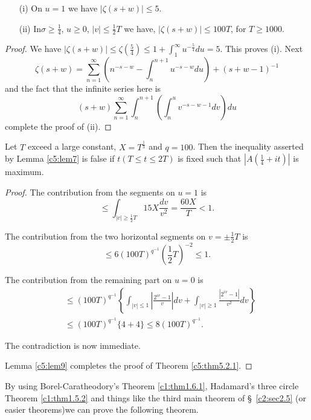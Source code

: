 \begin{lem}\label{c5:lem8}
\begin{itemize}
\item[\rm(i)] On $u=1$ we have $|\zeta(s+w)|\leq 5$. 

\item[\rm(ii)] In\pageoriginale $\sigma\geq \frac{1}{4}$, $u\geq 0$,
  $|v|\leq \frac{1}{2}T$ we have, $|\zeta(s+w)|\leq 100T$, for $T\geq
  1000$. 
\end{itemize}
\end{lem}

\begin{proof}
We have $|\zeta(s+w)|\leq \zeta(\frac{5}{4})\leq
1+\int^{\infty}_{1}u^{-\frac{5}{4}}du=5$. This proves (i). Next
$$
\zeta(s+w)=\sum^{\infty}_{n=1}(n^{-s-w}-\int^{n+1}_{n}u^{-s-w}du)+(s+w-1)^{-1} 
$$
and the fact that the infinite series here is
$$
(s+w)\sum^{\infty}_{n=1}\int^{n+1}_{n}\left(\int^{u}_{n}v^{-s-w-1}dv\right)du 
$$
complete the proof of (ii).
\end{proof}

\begin{lem}\label{c5:lem9}
Let $T$ exceed a large constant, $X=T^{\frac{1}{3}}$ and $q=100$. Then
the inequality asserted by Lemma \ref{c5:lem7} is false if $t(T\leq
t\leq 2T)$ is fixed such that $|A(\frac{1}{4}+it)|$ is maximum.
\end{lem}

\begin{proof}
The contribution from the segments on $u=1$ is
$$
\leq \int_{|v|\geq \frac{1}{2}T}15X\frac{dv}{v^{2}}=\frac{60X}{T}<1.
$$

The contribution from the two horizontal segments on $v=\pm
\frac{1}{2}T$ is
$$
\leq 6(100T)^{q^{-1}}\left(\frac{1}{2}T\right)^{-2}\leq 1.
$$

The contribution from the remaining part on $u=0$ is
\begin{align*}
&\leq (100T)^{q^{-1}}\left\{\int_{|v|\leq
    1}|\frac{2^{iv}-1}{v}|dv+\int_{|v|\geq
    1}\frac{|2^{iv}-1|}{v^{2}}dv\right\}\\
&\leq (100T)^{q^{-1}}\{4+4\}\leq 8(100T)^{q^{-1}}.
\end{align*}

The contradiction is now immediate.

Lemma \ref{c5:lem9} completes the proof of Theorem
\ref{c5:thm5.2.1}. 
\end{proof}

By using Borel-Caratheodory's Theorem \ref{c1:thm1.6.1}, Hadamard's
three circle Theorem \ref{c1:thm1.5.2} and things like the third
main theorem of \S\ \ref{c2:sec2.5} (or easier
theorems)\pageoriginale we can prove the following theorem.

